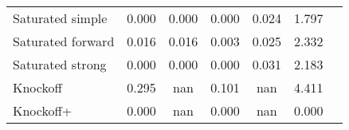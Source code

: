 \begin{tabular}{|l|c|c|c|c|c|c|}
Saturated simple      &                0.000 &                       0.000 &                      0.000 &                       0.024 &                   1.797 \\
Saturated forward     &                0.016 &                       0.016 &                      0.003 &                       0.025 &                   2.332 \\
Saturated strong      &                0.000 &                       0.000 &                      0.000 &                       0.031 &                   2.183 \\
Knockoff              &                0.295 &                         nan &                      0.101 &                         nan &                   4.411 \\
Knockoff+             &                0.000 &                         nan &                      0.000 &                         nan &                   0.000 \\
\hline
\end{tabular}
